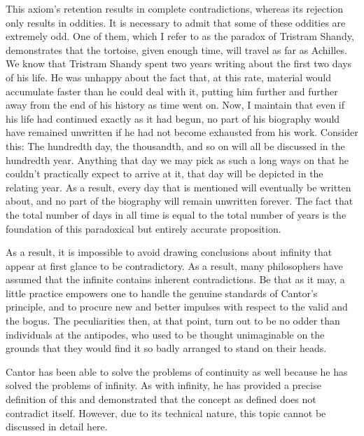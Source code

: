 \documentclass[a4paper,12pt]{book}[2004/02/16]
\theoremstyle{ilemma}
\theoremstyle{itheorem}
\theoremstyle{iother}
\theoremstyle{icorollary}
\theoremstyle{numcorollary}
\theoremstyle{idefinition}
\begin{document}
This axiom's retention results in complete contradictions, whereas its rejection only results in oddities. It is necessary to admit that some of these oddities are extremely odd. One of them, which I refer to as the paradox of Tristram Shandy, demonstrates that the tortoise, given enough time, will travel as far as Achilles.
We know that Tristram Shandy spent two years writing about the first two days of his life. He was unhappy about the fact that, at this rate, material would accumulate faster than he could deal with it, putting him further and further away from the end of his history as time went on.
Now, I maintain that even if his life had continued exactly as it had begun, no part of his biography would have remained unwritten if he had not become exhausted from his work. Consider this: The hundredth day, the thousandth, and so on will all be discussed in the hundredth year. Anything that day we may
pick as such a long ways on that he couldn't practically expect to arrive at it, that day will be
depicted in the relating year. As a result, every day that is mentioned will eventually be written about, and no part of the biography will remain unwritten forever. The fact that the total number of days in all time is equal to the total number of years is the foundation of this paradoxical but entirely accurate proposition.

As a result, it is impossible to avoid drawing conclusions about infinity that appear at first glance to be contradictory. As a result, many philosophers have assumed that the infinite contains inherent contradictions. Be that as it may, a little practice empowers one to
handle the genuine standards of Cantor's principle, and to procure new and
better impulses with respect to the valid and the bogus. The peculiarities then, at that point,
turn out to be no odder than individuals at the antipodes, who used to be
thought unimaginable on the grounds that they would find it so badly arranged to stand
on their heads.

Cantor has been able to solve the problems of continuity as well because he has solved the problems of infinity. As with infinity, he has provided a precise definition of this and demonstrated that the concept as defined does not contradict itself. However, due to its technical nature, this topic cannot be discussed in detail here.
\end{document}
